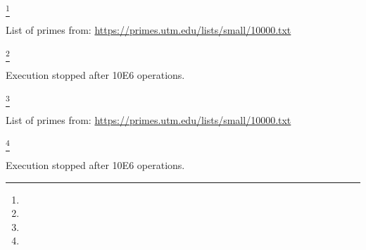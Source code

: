 \documentclass[11pt]{article} %
\begin{document}
\begin{table}[H]
\small
\centering

\footnote[1]{}{\begin{footnotesize} List of primes from: \url{https://primes.utm.edu/lists/small/10000.txt} \end{footnotesize}}
\footnote[2]{}{\begin{footnotesize}Execution stopped after 10E6 operations. \end{footnotesize}} 
\end{table}


\begin{table}[H]
\small
\centering

\footnote[1]{}{\begin{footnotesize} List of primes from: \url{https://primes.utm.edu/lists/small/10000.txt} \end{footnotesize}}
\footnote[2]{}{\begin{footnotesize}Execution stopped after 10E6 operations. \end{footnotesize}} 

\end{table}
\end{document}
